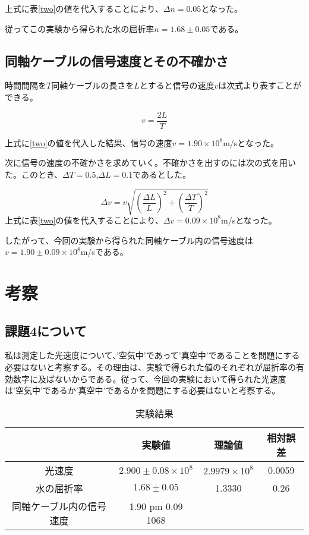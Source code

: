 \documentclass{jsarticle}
\begin{document}
上式に表\ref{two}の値を代入することにより、$\Delta n = 0.05$となった。

従ってこの実験から得られた水の屈折率$n = 1.68 \pm 0.05$である。




\subsection{同軸ケーブルの信号速度とその不確かさ}
時間間隔を$T$同軸ケーブルの長さを$L$とすると信号の速度$v$は次式より表すことができる。

\begin{equation}
    v = \frac{2L}{T}
\end{equation}

上式に\ref{two}の値を代入した結果、信号の速度$v = 1.90 \times 10^8$m/sとなった。\\
\par 次に信号の速度の不確かさを求めていく。不確かさを出すのには次の式を用いた。このとき、$\Delta T = 0.5$,$\Delta L = 0.1$であるとした。

\begin{equation}
    \Delta v = v\sqrt{(\frac{\Delta L}{L})^2 + (\frac{\Delta T}{T})^2}
\end{equation}
上式に表\ref{two}の値を代入することにより、$\Delta v = 0.09 \times 10^8$m/sとなった。

したがって、今回の実験から得られた同軸ケーブル内の信号速度は$v = 1.90 \pm 0.09 \times 10^8$m/sである。



\section{考察}

\subsection{課題4について}
私は測定した光速度について、’空気中’であって’真空中’であることを問題にする必要はないと考察する。その理由は、実験で得られた値のそれぞれが屈折率の有効数字に及ばないからである。従って、今回の実験において得られた光速度は’空気中’であるか’真空中’であるかを問題にする必要はないと考察する。

\begin{table}[H]
\centering
\caption{実験結果}
\label{my-label}
\begin{tabular}{|c|c|c|c|}
\hline
             & 実験値                & 理論値         & 相対誤差  \\ \hline
光速度          & $2.900 \pm 0.08 \times 10^8$ & $2.9979 \times 10^8$ & 0.0059 \\\hline
水の屈折率        & $1.68 \pm 0.05$       & 1.3330      & 0.26 \\ \hline
同軸ケーブル内の信号速度 & 1.90 pm 0.09 1068  &             &      \\ \hline
\end{tabular}
\end{table}
\end{document}
